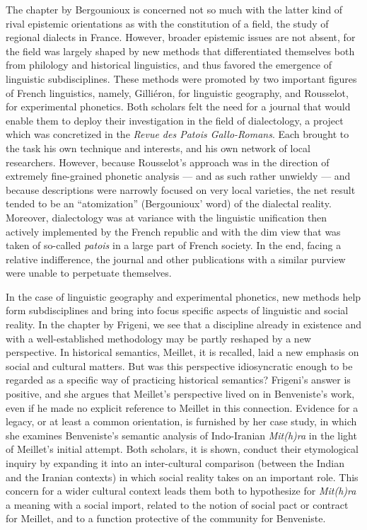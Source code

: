 \documentclass[output=paper]{langsci/langscibook}
\begin{document}
The chapter by Bergounioux is concerned not so much with the latter kind of rival epistemic orientations as with the constitution of a field, the study of regional dialects in France. However, broader epistemic issues are not absent, for the field was largely shaped by new methods that differentiated themselves both from philology and historical linguistics, and thus favored the emergence of linguistic subdisciplines. These methods were promoted by two important figures of French linguistics, namely, Gilliéron, for linguistic geography, and Rousselot, for experimental phonetics. Both scholars felt the need for a journal that would enable them to deploy their investigation in the field of dialectology, a project which was concretized in the \emph{Revue des Patois Gallo-Romans}. Each brought to the task his own technique and interests, and his own network of local researchers. However, because Rousselot's approach was in the direction of extremely fine-grained phonetic analysis — and as such rather unwieldy — and because descriptions were narrowly focused on very local varieties, the net result tended to be an ``atomization'' (Bergounioux' word) of the dialectal reality. Moreover, dialectology was at variance with the linguistic unification then actively implemented by the French republic and with the dim view that was taken of so-called \emph{patois} in a large part of French society. In the end, facing a relative indifference, the journal and other publications with a similar purview were unable to perpetuate themselves.

In the case of linguistic geography and experimental phonetics, new methods help form subdisciplines and bring into focus specific aspects of linguistic and social reality. In the chapter by Frigeni, we see that a discipline already in existence and with a well-established methodology may be partly reshaped by a new perspective. In historical semantics, Meillet, it is recalled, laid a new emphasis on social and cultural matters. But was this perspective idiosyncratic enough to be regarded as a specific way of practicing historical semantics? Frigeni's answer is positive, and she argues that Meillet's perspective lived on in Benveniste's work, even if he made no explicit reference to Meillet in this connection. Evidence for a legacy, or at least a common orientation, is furnished by her case study, in which she examines Benveniste's semantic analysis of Indo-Iranian \emph{Mit(h)ra} in the light of Meillet's initial attempt. Both scholars, it is shown, conduct their etymological inquiry by expanding it into an inter-cultural comparison (between the Indian and the Iranian contexts) in which social reality takes on an important role. This concern for a wider cultural context leads them both to hypothesize for \emph{Mit(h)ra} a meaning with a social import, related to the notion of social pact or contract for Meillet, and to a function protective of the community for Benveniste.
\end{document}

